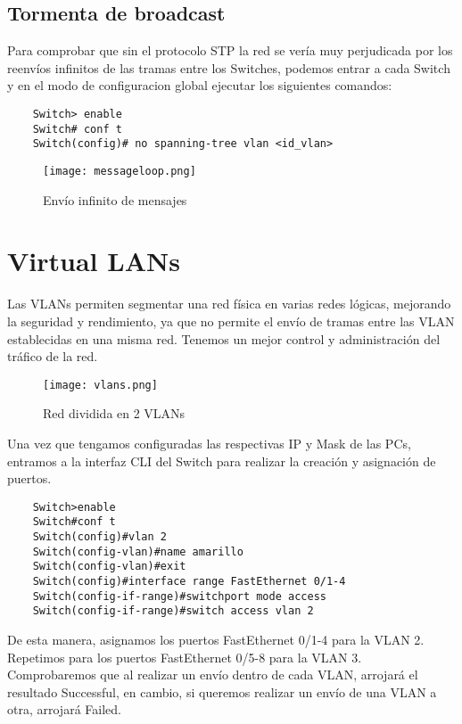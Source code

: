 \documentclass{article}
\begin{document}
\subsection{Tormenta de broadcast}
Para comprobar que sin el protocolo STP la red se vería muy perjudicada por los reenvíos infinitos de las tramas entre los Switches, podemos entrar a cada Switch y en el modo de configuracion global ejecutar los siguientes comandos:
\begin{lstlisting}
    Switch> enable
    Switch# conf t
    Switch(config)# no spanning-tree vlan <id_vlan> 
\end{lstlisting}
\begin{figure}[H]
    \centering
    \texttt{[image: messageloop.png]}
    \caption{Envío infinito de mensajes}
    \label{fig:enter-label}
\end{figure}

\section{Virtual LANs}
Las VLANs permiten segmentar una red física en varias redes lógicas, mejorando la seguridad  y rendimiento, ya que no permite el envío de tramas entre las VLAN establecidas en una misma red. Tenemos un mejor control y administración del tráfico de la red.

\begin{figure}[H]
    \centering
    \texttt{[image: vlans.png]}
    \caption{Red dividida en 2 VLANs}
    \label{fig:enter-labe}
\end{figure}
Una vez que tengamos configuradas las respectivas IP y Mask de las PCs, entramos a la interfaz CLI del Switch para realizar la creación y asignación de puertos.

\begin{lstlisting}
    Switch>enable
    Switch#conf t
    Switch(config)#vlan 2     
    Switch(config-vlan)#name amarillo
    Switch(config-vlan)#exit
    Switch(config)#interface range FastEthernet 0/1-4
    Switch(config-if-range)#switchport mode access
    Switch(config-if-range)#switch access vlan 2
\end{lstlisting}
De esta manera, asignamos los puertos FastEthernet 0/1-4 para la VLAN 2. Repetimos para los puertos FastEthernet 0/5-8 para la VLAN 3.
\\
Comprobaremos que al realizar un envío dentro de cada VLAN, arrojará el resultado Successful, en cambio, si queremos realizar un envío de una VLAN a otra, arrojará Failed.
\end{document}
